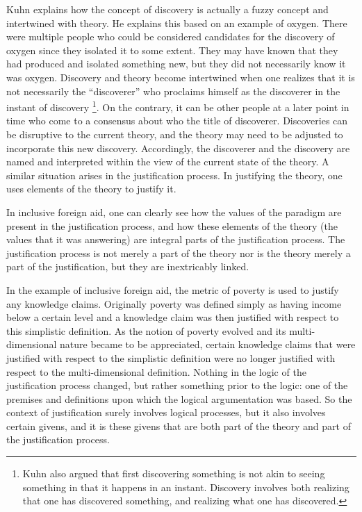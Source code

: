 \documentclass[a4paper]{article}
\begin{document}
Kuhn explains how the concept of discovery is actually a fuzzy concept and
intertwined with theory. He explains this based on an example of oxygen.
There were multiple people who could be considered candidates for the
discovery of oxygen since they isolated it to some extent. They may have known
that they had produced and isolated something new, but they did not
necessarily know it was oxygen. Discovery and theory become intertwined when
one realizes that it is not necessarily the ``discoverer'' who proclaims
himself as the discoverer in the instant of discovery 
    \footnote{Kuhn also argued that first discovering something is not akin to
    seeing something in that it happens in an instant. Discovery involves both
    realizing that one has discovered something, and realizing what one has
    discovered.}.
On the contrary, it can be other people at a later point in time who come to a
consensus about who the title of discoverer. Discoveries can be disruptive to
the current theory, and the theory may need to be adjusted to incorporate this
new discovery. Accordingly, the discoverer and the discovery are named and
interpreted within the view of the current state of the theory.  A similar
situation arises in the justification process. In justifying the theory, one
uses elements of the theory to justify it. 

In inclusive foreign aid, one can clearly see how the values of the paradigm
are present in the justification process, and how these elements of the theory
(the values that it was answering) are integral parts of the justification
process. The justification process is not merely a part of the theory nor is
the theory merely a part of the justification, but they are inextricably
linked.

In the example of
inclusive foreign aid, the metric of poverty is used to justify any knowledge
claims. Originally poverty was defined simply as having income below a certain
level and a knowledge claim was then justified with respect to this simplistic
definition. As the notion of poverty evolved and its multi-dimensional nature
became to be appreciated, certain knowledge claims that were justified with
respect to the simplistic definition were no longer justified with respect to
the multi-dimensional definition. Nothing in the logic of the justification
process changed, but rather something prior to the logic: one of the premises
and definitions upon which the logical argumentation was based. So the
context of justification surely involves logical processes, but it also
involves certain givens, and it is these givens that are both part of the
theory and part of the justification process.
\end{document}

